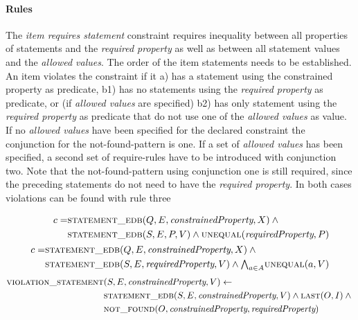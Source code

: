 \documentclass[hyperref,bachelorofscience,fleqn]{cgvpub}
\begin{document}
\paragraph{Rules}
The \emph{item requires statement} constraint requires inequality between all properties of statements and the \emph{required property} as well as between all statement values and the \emph{allowed values}. The order of the item statements needs to be established. An item violates the constraint if it a) has a statement using the constrained property as predicate, b1) has no statements using the \emph{required property} as predicate, or (if \emph{allowed values} are specified) b2) has only statement using the \emph{required property} as predicate that do not use one of the \emph{allowed values} as value. If no \emph{allowed values} have been specified for the declared constraint the conjunction for the not-found-pattern is one. If a set of \emph{allowed values} has been specified, a second set of require-rules have to be introduced with conjunction two. Note that the not-found-pattern using conjunction one is still required, since the preceding statements do not need to have the \emph{required property}. In both cases violations can be found with rule three

\begin{align}
\begin{split}
c = &\textsc{statement\_edb}(Q, E, \emph{constrainedProperty}, X) \wedge{} \\
&\textsc{statement\_edb}(S, E, P, V) \wedge \textsc{unequal}(\emph{requiredProperty}, P)
\end{split} \\
\begin{split}
c = &\textsc{statement\_edb}(Q, E, \emph{constrainedProperty}, X) \wedge{} \\
&\textsc{statement\_edb}(S, E, \emph{requiredProperty}, V) \wedge {\textstyle\bigwedge}_{a \in A} \textsc{unequal}(a, V)
\end{split}
\end{align}
\begin{align}
\begin{split}
\textsc{violation\_statement}&(S, E, \emph{constrainedProperty}, V) \leftarrow \\
&\textsc{statement\_edb}(S, E, \emph{constrainedProperty}, V) \wedge{} \textsc{last}(O, I) \wedge{} \\
&\textsc{not\_found}(O, \emph{constrainedProperty}, \emph{requiredProperty})
\end{split}
\end{align}
\end{document}
